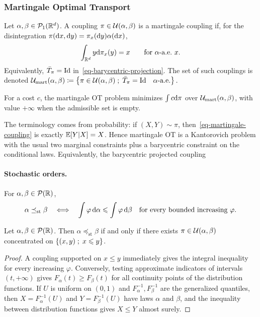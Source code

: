 \subsubsection{Martingale Optimal Transport}
\label{sec-martingale-ot}
\begin{defn}\label{def-martingale-coupling}
Let $\alpha,\beta\in\mathcal{P}_1(\mathbb{R}^d)$. A coupling $\pi\in\mathcal{U}(\alpha,\beta)$ is a martingale coupling if, for the disintegration $\pi(\mathrm{d} x,\mathrm{d} y)=\pi_x(\mathrm{d} y)\alpha(\mathrm{d} x)$,
\begin{equation}\label{eq-martingale-coupling}
\int_{\mathbb{R}^d}y\mathrm{d}\pi_x(y)=x
\qquad\text{for $\alpha$-a.e.\ }x.
\end{equation}
Equivalently, $\bar T_\pi=\mathrm{Id}$ in~\eqref{eq-barycentric-projection}. The set of such couplings is denoted
\(\mathcal{U}_{\mathrm{mart}}(\alpha,\beta) \coloneqq \left\{ \pi\in\mathcal{U}(\alpha,\beta) \;;\; \bar T_\pi=\mathrm{Id}\quad\alpha\text{-a.e.} \right\}.\)
\end{defn}
For a cost $c$, the martingale OT problem minimizes $\int c\mathrm{d}\pi$ over $\mathcal{U}_{\mathrm{mart}}(\alpha,\beta)$, with value $+\infty$ when the admissible set is empty.

The terminology comes from probability: if $(X,Y)\sim\pi$, then~\eqref{eq-martingale-coupling} is exactly $\mathbb{E}[Y|X]=X$. Hence martingale OT is a Kantorovich problem with the usual two marginal constraints plus a barycentric constraint on the conditional laws. Equivalently, the barycentric projected coupling

\paragraph{Stochastic orders.}
\begin{defn}\label{def-classical-stochastic-order}
For $\alpha,\beta\in\mathcal{P}(\mathbb{R})$,
\[
\alpha\preceq_{\mathrm{st}}\beta
\quad\Longleftrightarrow\quad
\int\varphi\,\mathrm{d}\alpha\leqslant\int\varphi\,\mathrm{d}\beta
\quad\text{for every bounded increasing }\varphi.
\]
\end{defn}
\begin{prop}\label{prop-strassen-stochastic-order}
Let $\alpha,\beta\in\mathcal{P}(\mathbb{R})$. Then $\alpha\preceq_{\mathrm{st}}\beta$ if and only if there exists $\pi\in\mathcal{U}(\alpha,\beta)$ concentrated on $\left\{ (x,y) \;;\; x\leqslant y \right\}$.
\end{prop}
\begin{proof}
A coupling supported on $x\leq y$ immediately gives the integral inequality for every increasing $\varphi$. Conversely, testing approximate indicators of intervals $(t,+\infty)$ gives $F_\alpha(t)\geq F_\beta(t)$ for all continuity points of the distribution functions. If $U$ is uniform on $(0,1)$ and $F_\alpha^{-1},F_\beta^{-1}$ are the generalized quantiles, then $X=F_\alpha^{-1}(U)$ and $Y=F_\beta^{-1}(U)$ have laws $\alpha$ and $\beta$, and the inequality between distribution functions gives $X\leq Y$ almost surely.
\end{proof}
